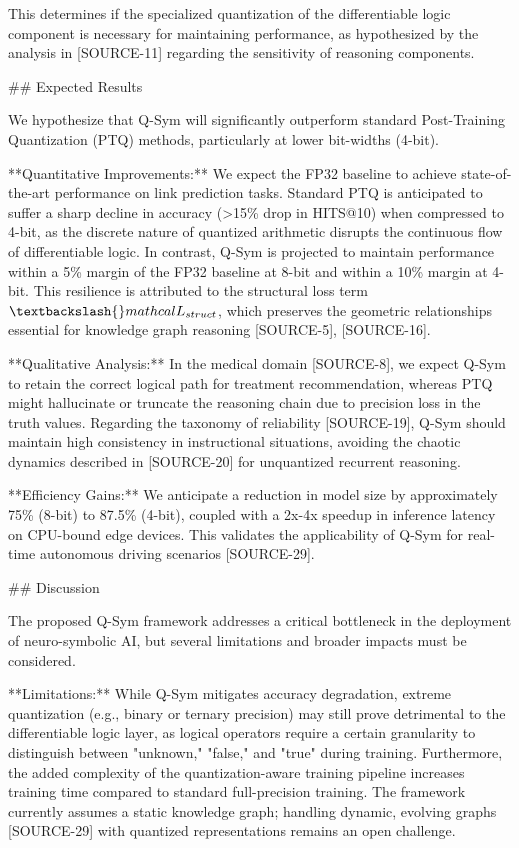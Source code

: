 \documentclass{article}
\begin{document}
This determines if the specialized quantization of the differentiable logic component is necessary for maintaining performance, as hypothesized by the analysis in [SOURCE-11] regarding the sensitivity of reasoning components.

\#\# Expected Results

We hypothesize that Q-Sym will significantly outperform standard Post-Training Quantization (PTQ) methods, particularly at lower bit-widths (4-bit).

**Quantitative Improvements:**
We expect the FP32 baseline to achieve state-of-the-art performance on link prediction tasks. Standard PTQ is anticipated to suffer a sharp decline in accuracy (>15\% drop in HITS@10) when compressed to 4-bit, as the discrete nature of quantized arithmetic disrupts the continuous flow of differentiable logic. In contrast, Q-Sym is projected to maintain performance within a 5\% margin of the FP32 baseline at 8-bit and within a 10\% margin at 4-bit. This resilience is attributed to the structural loss term $\textbackslash{}mathcal{L}_{struct}$, which preserves the geometric relationships essential for knowledge graph reasoning [SOURCE-5], [SOURCE-16].

**Qualitative Analysis:**
In the medical domain [SOURCE-8], we expect Q-Sym to retain the correct logical path for treatment recommendation, whereas PTQ might hallucinate or truncate the reasoning chain due to precision loss in the truth values. Regarding the taxonomy of reliability [SOURCE-19], Q-Sym should maintain high consistency in instructional situations, avoiding the chaotic dynamics described in [SOURCE-20] for unquantized recurrent reasoning.

**Efficiency Gains:**
We anticipate a reduction in model size by approximately 75\% (8-bit) to 87.5\% (4-bit), coupled with a 2x-4x speedup in inference latency on CPU-bound edge devices. This validates the applicability of Q-Sym for real-time autonomous driving scenarios [SOURCE-29].

\#\# Discussion

The proposed Q-Sym framework addresses a critical bottleneck in the deployment of neuro-symbolic AI, but several limitations and broader impacts must be considered.

**Limitations:**
While Q-Sym mitigates accuracy degradation, extreme quantization (e.g., binary or ternary precision) may still prove detrimental to the differentiable logic layer, as logical operators require a certain granularity to distinguish between "unknown," "false," and "true" during training. Furthermore, the added complexity of the quantization-aware training pipeline increases training time compared to standard full-precision training. The framework currently assumes a static knowledge graph; handling dynamic, evolving graphs [SOURCE-29] with quantized representations remains an open challenge.
\end{document}
